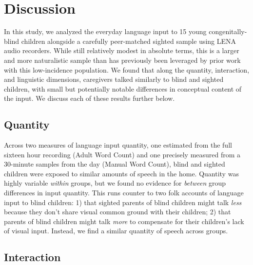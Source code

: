 \documentclass[
  man]{apa6}
\begin{document}
\hypertarget{discussion}{%
\section{Discussion}\label{discussion}}

In this study, we analyzed the everyday language input to 15 young congenitally-blind children alongside a carefully peer-matched sighted sample using LENA audio recorders. While still relatively modest in absolute terms, this is a larger and more naturalistic sample than has previously been leveraged by prior work with this low-incidence population. We found that along the quantity, interaction, and linguistic dimensions, caregivers talked similarly to blind and sighted children, with small but potentially notable differences in conceptual content of the input. We discuss each of these results further below.

\hypertarget{quantity-1}{%
\subsection{Quantity}\label{quantity-1}}

Across two measures of language input quantity, one estimated from the full sixteen hour recording (Adult Word Count) and one precisely measured from a 30-minute samples from the day (Manual Word Count), blind and sighted children were exposed to similar amounts of speech in the home. Quantity was highly variable \emph{within} groups, but we found no evidence for \emph{between} group differences in input quantity. This runs counter to two folk accounts of language input to blind children: 1) that sighted parents of blind children might talk \emph{less} because they don't share visual common ground with their children; 2) that parents of blind children might talk \emph{more} to compensate for their children's lack of visual input. Instead, we find a similar quantity of speech across groups.

\hypertarget{interaction-2}{%
\subsection{Interaction}\label{interaction-2}}
\end{document}

